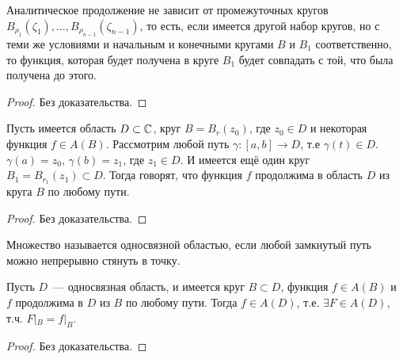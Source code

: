 \documentclass[main]{subfiles}
\begin{document}
\begin{theorem}
    Аналитическое продолжение не зависит от промежуточных кругов $B_{\rho_1}(\zeta_1), \dotsc, B_{\rho_{n-1}}(\zeta_{n-1})$, то есть, если имеется другой набор кругов, но с теми же условиями и начальным и конечными кругами $B$ и $B_1$ соответственно, то функция, которая будет получена в круге $B_1$ будет совпадать с той, что была получена до этого.
\end{theorem}
\begin{proof}
    Без доказательства.
\end{proof}

\begin{theorem}
    Пусть имеется область $D \subset \mathbb{C}$, круг $B = B_r(z_0)$, где $z_0 \in D$ и некоторая функция $f \in A(B)$.
    Рассмотрим любой путь $\gamma: [a,b] \to D$, т.е $\gamma(t) \in D$.
    $\gamma(a) = z_0$, $\gamma(b) = z_1$, где $z_1 \in D$.
    И имеется ещё один круг $B_1 = B_{r_1}(z_1) \subset D$.
    Тогда говорят, что функция $f$ продолжима в область $D$ из круга $B$ по любому пути.
\end{theorem}
\begin{proof}
    Без доказательства.
\end{proof}

\begin{definition}
    Множество называется односвязной областью, если любой замкнутый путь можно непрерывно стянуть в точку.
\end{definition}
\begin{theorem}[о монодромии]
    Пусть $D$~--- односвязная область, и имеется круг $B \subset D$, функция $f \in A(B)$ и $f$ продолжима в $D$ из $B$ по любому пути.
    Тогда $f \in A(D)$, т.е. $\exists F \in A(D)$, т.ч. $F|_B = f|_B$.
\end{theorem}
\begin{proof}
    Без доказательства.
\end{proof}
\end{document}
